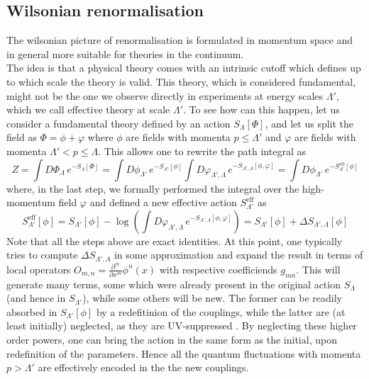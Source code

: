\subsection{Wilsonian renormalisation}
\label{sec:wilson_rg}
The wilsonian picture of renormalisation \cite{WilsonRG1,WilsonRG2} is formulated in momentum space and in general more suitable for theories in the continuum.\\
The idea is that a physical theory comes with an intrinsic cutoff which defines up to which scale the theory is valid. This theory, which is considered fundamental, might not be the one
we observe directly in experiments at energy scales $\Lambda'$, which we call effective theory at scale $\Lambda'$. To see how can this happen, let us consider a fundamental theory defined by an action $S_\Lambda[\Phi]$, and let us split the field as $\Phi = \phi + \varphi$ where $\phi$ are fields with momenta $p \leq \Lambda'$ and $\varphi$ are fields with momenta $\Lambda' < p \leq \Lambda$. This allows one to rewrite the path integral as
\begin{equation*}
    Z = \int D\Phi_\Lambda \, e^{-S_\Lambda[\Phi]} = \int D\phi_{\Lambda'} \, e^{-S_{\Lambda'}[\phi]} \int D\varphi_{\Lambda', \Lambda}  \, e^{-S_{\Lambda', \Lambda}[\phi, \varphi]} = \int D\phi_{\Lambda'} \, e^{-S_{\Lambda'}^\text{eff}[\phi]}
\end{equation*}
where, in the last step, we formally performed the integral over the high-momentum field $\varphi$ and defined a new effective action $S^\text{eff}_{\Lambda'}$ as
\begin{equation*}
    S_{\Lambda'}^\text{eff}[\phi] = S_{\Lambda'}[\phi] - \log\left( \int D\varphi_{\Lambda', \Lambda}  \, e^{-S_{\Lambda', \Lambda}[\phi, \varphi]}\right) =  S_{\Lambda'}[\phi] + \Delta S_{\Lambda', \Lambda}[\phi]
\end{equation*}
Note that all the steps above are exact identities. At this point, one typically tries to compute $\Delta S_{\Lambda', \Lambda}$ in some approximation and expand the result in terms of local operators $O_{m,n} = \frac{\partial^m}{\partial x^m}\phi^n(x)$ with respective coefficiends $g_{mn}$. This will generate many terms, some which were already present in the original action $S_\Lambda$ (and hence in $S_{\Lambda'}$), while some others will be new. The former can be readily absorbed in $S_{\Lambda'}[\phi]$ by a redefitinion of the couplings, while the latter are (at least initially) neglected, as they are UV-suppressed \cite{SOMEONE}. By neglecting these higher order powers, one can bring the action in the same form as the initial, upon redefinition of the parameters. Hence all the quantum fluctuations with momenta $p > \Lambda'$ are effectively encoded in the the new couplings. \\
